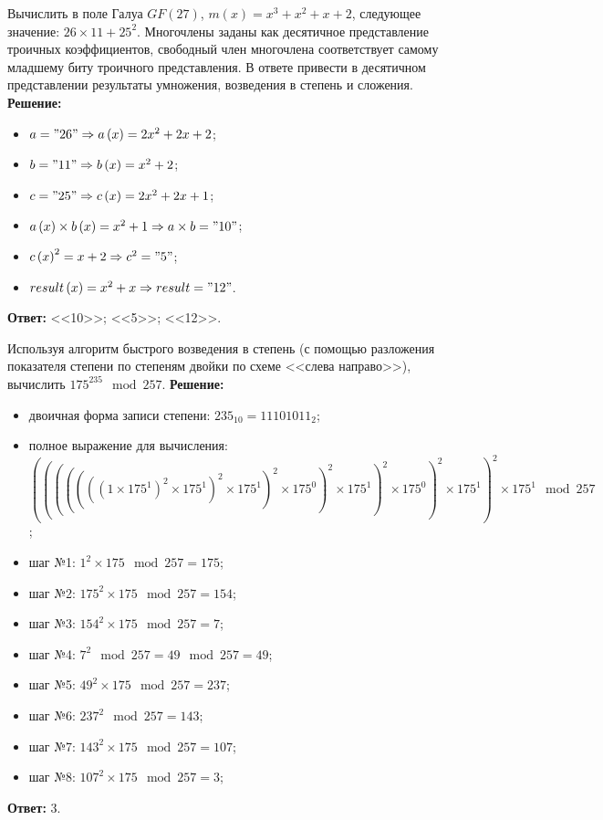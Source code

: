 \tasknumber Вычислить в поле Галуа $GF\left( 27 \right)$, $m\left( x \right) = x^{3} + x^{2} + x + 2$, следующее значение: $26 \times 11 + 25^2$. Многочлены заданы как десятичное представление троичных коэффициентов, свободный член многочлена соответствует самому младшему биту троичного представления. В ответе привести в десятичном представлении результаты умножения, возведения в степень и сложения.
\medbreak
\textbf{Решение:}
\begin{itemize}\itemsep1pt \parskip0pt 
	\item $a = "26" \Rightarrow a\left( x \right) = 2 x^{2} + 2 x + 2$;
	\item $b = "11" \Rightarrow b\left( x \right) = x^{2} + 2$;
	\item $c = "25" \Rightarrow c\left( x \right) = 2 x^{2} + 2 x + 1$;
	\item $a \left( x \right) \times b \left( x \right) = x^{2} + 1 \Rightarrow a \times b = "10"$;
	\item $c \left( x \right)^2 = x + 2 \Rightarrow c^2 = "5"$;
	\item $result\left( x \right) = x^{2} + x \Rightarrow result = "12"$.
\end{itemize}
\medbreak
\textbf{Ответ:} <<10>>; <<5>>; <<12>>.
\bigbreak

\tasknumber Используя алгоритм быстрого возведения в степень (с помощью разложения показателя степени по степеням двойки по схеме <<слева направо>>), вычислить ${175}^{235} \mod {257}$.
\medbreak
\textbf{Решение:}
\begin{itemize}\itemsep1pt \parskip0pt 
	\item двоичная форма записи степени: $235_{10} = 11101011_{2}$;
	\item полное выражение для вычисления: $(((((((1 \times {175}^1)^2 \times {175}^1)^2 \times {175}^1)^2 \times {175}^0)^2 \times {175}^1)^2 \times {175}^0)^2 \times {175}^1)^2 \times {175}^1\mod 257$;
	\item шаг №1: $1^2 \times 175 \mod 257  = 175$;
	\item шаг №2: $175^2 \times 175 \mod 257 = 154$;
	\item шаг №3: $154^2 \times 175 \mod 257 = 7$;
	\item шаг №4: $7^2 \mod 257 = 49 \mod 257 = 49$;
	\item шаг №5: $49^2 \times 175 \mod 257 = 237$;
	\item шаг №6: $237^2 \mod 257 = 143$;
	\item шаг №7: $143^2 \times 175 \mod 257 = 107$;
	\item шаг №8: $107^2 \times 175 \mod 257 = 3$;
\end{itemize}
\medbreak
\textbf{Ответ:} 3.
\bigbreak

